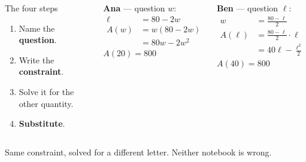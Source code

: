 \documentclass[aspectratio=169, 11pt]{beamer}
\begin{document}
\begin{frame}[t, plain]

  \begin{columns}[T, onlytextwidth]
      \begin{block}{The four steps}
        \begin{enumerate}\setlength{\itemsep}{2pt}
          \item Name the \textbf{question}.
          \item Write the \textbf{constraint}.
          \item Solve it for the other quantity.
          \item \textbf{Substitute}.
        \end{enumerate}
      \end{block}

      \textbf{Ana} --- question \(w\):
      \begin{align*}
        \ell &= 80 - 2w \\
        A(w) &= w(80 - 2w) \\
             &= 80w - 2w^2
      \end{align*}
      \(A(20) = 800\) \checkmark

      \textbf{Ben} --- question \(\ell\):
      \begin{align*}
        w &= \frac{80 - \ell}{2} \\
        A(\ell) &= \frac{80-\ell}{2}\cdot \ell \\
                &= 40\ell - \frac{\ell^2}{2}
      \end{align*}
      \(A(40) = 800\) \checkmark
  \end{columns}

  \medskip
  \begin{center}
    Same constraint, solved for a different letter. Neither notebook is wrong.
  \end{center}
\end{frame}
\end{document}
